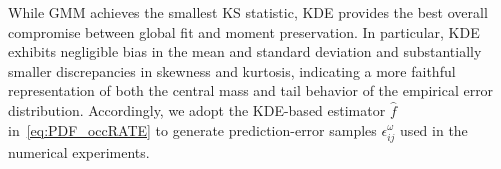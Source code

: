 \documentclass[a4paper,fleqn]{cas-sc}
\newcommand{\stkout}[1]{\ifmmode\text{\sout{\ensuremath{#1}}}\else\sout{#1}\fi}
\newcommand\rev[3]{\textcolor{blue}{\begin{scriptsize}{#1}\end{scriptsize}\stkout{#2}}\textcolor{red}{#3}}
\newcommand\rev[3]{\ignorespaces#3\ignorespaces\unskip}
\begin{document}
%
While GMM achieves the smallest KS statistic, KDE provides the best overall compromise between global fit and moment preservation.
In particular, KDE exhibits negligible bias in the mean and standard deviation and substantially smaller discrepancies in skewness and kurtosis,
indicating a more faithful representation of both the central mass and tail behavior of the empirical error distribution.
%
Accordingly, we adopt the KDE-based estimator $\hat f$ in~\eqref{eq:PDF_occRATE} to generate prediction-error samples
$\epsilon_{ij}^{\omega}$ used in the numerical experiments.


\end{document}

